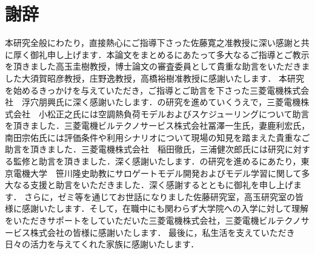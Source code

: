 \chapter*{謝辞}

\hspace{1em}
本研究全般にわたり，直接熱心にご指導下さった佐藤寛之准教授に深い感謝と共に厚く御礼申し上げます．本論文をまとめるにあたって多大なるご指導とご教示を頂きました高玉圭樹教授，博士論文の審査委員として貴重な助言をいただきました大須賀昭彦教授，庄野逸教授，高橋裕樹准教授に感謝いたします．
本研究を始めるきっかけを与えていただき，ご指導とご助言を下さった三菱電機株式会社　浮穴朋興氏に深く感謝いたします．の研究を進めていくうえで，三菱電機株式会社　小松正之氏には空調熱負荷モデルおよびスケジューリングについて助言を頂きました．三菱電機ビルテクノサービス株式会社冨澤一生氏，妻鹿利宏氏，南田宗佑氏には評価条件や利用シナリオについて現場の知見を踏まえた貴重なご助言を頂きました．三菱電機株式会社　稲田徹氏，三浦健次郎氏には研究に対する監修と助言を頂きました．深く感謝いたします．の研究を進めるにあたり，東京電機大学　笹川隆史助教にサロゲートモデル開発およびモデル学習に関して多大なる支援と助言をいただきました．深く感謝するとともに御礼を申し上げます．
さらに，ゼミ等を通じてお世話になりました佐藤研究室，高玉研究室の皆様に感謝いたします．そして，在職中にも関わらず大学院への入学に対して理解をいただきサポートをしていただいた三菱電機株式会社，三菱電機ビルテクノサービス株式会社の皆様に感謝いたします．
最後に，私生活を支えていただき日々の活力を与えてくれた家族に感謝いたします．

